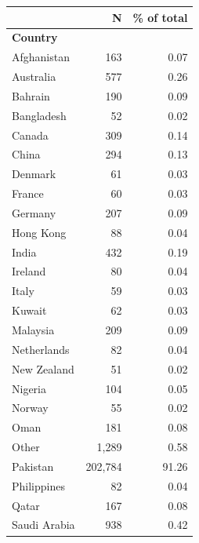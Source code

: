 \begin{tabular}{lrr}


\toprule


 & N & \% of total \\


\midrule


\multicolumn{3}{l}{\textbf{Country}}\\ 
\midrule
Afghanistan         &         163&        0.07\\
Australia           &         577&        0.26\\
Bahrain             &         190&        0.09\\
Bangladesh          &          52&        0.02\\
Canada              &         309&        0.14\\
China               &         294&        0.13\\
Denmark             &          61&        0.03\\
France              &          60&        0.03\\
Germany             &         207&        0.09\\
Hong Kong           &          88&        0.04\\
India               &         432&        0.19\\
Ireland             &          80&        0.04\\
Italy               &          59&        0.03\\
Kuwait              &          62&        0.03\\
Malaysia            &         209&        0.09\\
Netherlands         &          82&        0.04\\
New Zealand         &          51&        0.02\\
Nigeria             &         104&        0.05\\
Norway              &          55&        0.02\\
Oman                &         181&        0.08\\
Other               &       1,289&        0.58\\
Pakistan            &     202,784&       91.26\\
Philippines         &          82&        0.04\\
Qatar               &         167&        0.08\\
Saudi Arabia        &         938&        0.42\\

\end{tabular}
